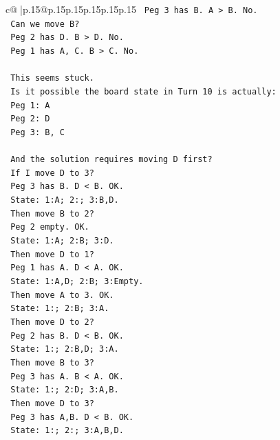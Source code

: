 \documentclass{article}
\begin{document}
{\begin{supertabular}{c@{$\;$}|p{.15\linewidth}@{}p{.15\linewidth}p{.15\linewidth}p{.15\linewidth}p{.15\linewidth}p{.15\linewidth}}
{{{\texttt{            Peg 3 has B. A > B. No.} \\
\texttt{            Can we move B?} \\
\texttt{            Peg 2 has D. B > D. No.} \\
\texttt{            Peg 1 has A, C. B > C. No.} \\
\\ 
\texttt{            This seems stuck.} \\
\texttt{            Is it possible the board state in Turn 10 is actually:} \\
\texttt{            Peg 1: A} \\
\texttt{            Peg 2: D} \\
\texttt{            Peg 3: B, C} \\
\\ 
\texttt{            And the solution requires moving D first?} \\
\texttt{            If I move D to 3?} \\
\texttt{            Peg 3 has B. D < B. OK.} \\
\texttt{            State: 1:A; 2:; 3:B,D.} \\
\texttt{            Then move B to 2?} \\
\texttt{            Peg 2 empty. OK.} \\
\texttt{            State: 1:A; 2:B; 3:D.} \\
\texttt{            Then move D to 1?} \\
\texttt{            Peg 1 has A. D < A. OK.} \\
\texttt{            State: 1:A,D; 2:B; 3:Empty.} \\
\texttt{            Then move A to 3. OK.} \\
\texttt{            State: 1:; 2:B; 3:A.} \\
\texttt{            Then move D to 2?} \\
\texttt{            Peg 2 has B. D < B. OK.} \\
\texttt{            State: 1:; 2:B,D; 3:A.} \\
\texttt{            Then move B to 3?} \\
\texttt{            Peg 3 has A. B < A. OK.} \\
\texttt{            State: 1:; 2:D; 3:A,B.} \\
\texttt{            Then move D to 3?} \\
\texttt{            Peg 3 has A,B. D < B. OK.} \\
\texttt{            State: 1:; 2:; 3:A,B,D.} \\
}}}
\end{supertabular}}
\end{document}
